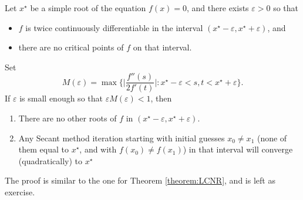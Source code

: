 \begin{theorem}\label{theorem:LCScnt}
Let $x^\star$ be a simple root of the equation $f(x)=0$, and there exists $\varepsilon > 0$ so that 
\begin{itemize}
	\item $f$ is twice continuously differentiable in the interval $(x^\star-\varepsilon, x^\star + \varepsilon)$, and
	\item there are no critical points of $f$ on that interval.
\end{itemize}  
Set
\begin{equation*}
M(\varepsilon) = \max \bigg\{ \bigg\lvert \frac{f''(s)}{2f'(t)} \bigg\rvert : x^\star -\varepsilon < s,t < x^\star + \varepsilon \bigg\}.
\end{equation*}
If $\varepsilon$ is small enough so that $\varepsilon M(\varepsilon) < 1$, then
\begin{enumerate}
	\item \label{thm:LCScnt1} There are no other roots of $f$ in $(x^\star -\varepsilon, x^\star+\varepsilon)$.
	\item \label{thm:LCScnt2} Any Secant method iteration starting with initial guesses $x_0 \neq x_1$ (none of them equal to $x^\star$, and with $f(x_0) \neq f(x_1)$) in that interval will converge (quadratically) to $x^\star$
\end{enumerate} 
\end{theorem}

The proof is similar to the one for Theorem \ref{theorem:LCNR}, and is left as exercise.

